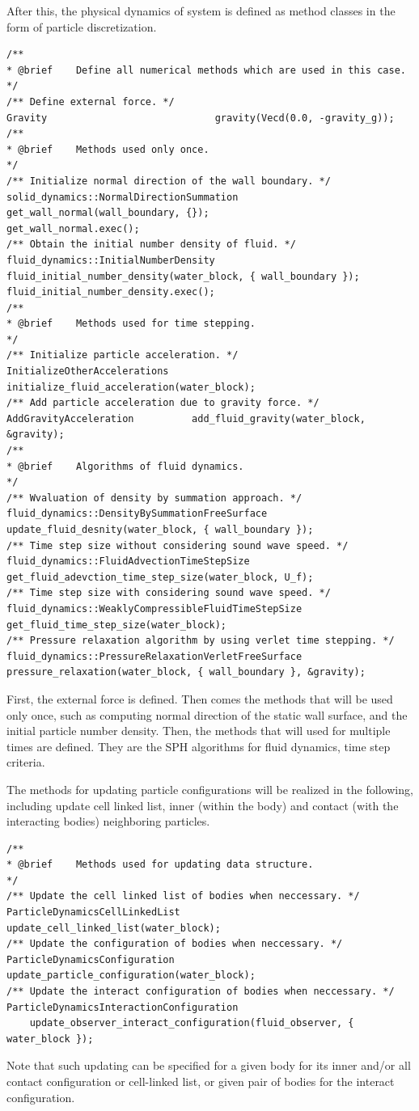 \documentclass[12pt, a4paper,onecolumn]{article}
\begin{document}
After this, the physical dynamics of system is defined 
as method classes in the form of particle discretization.
%
\begin{lstlisting}[basicstyle=\ttfamily\footnotesize]
	/**
* @brief 	Define all numerical methods which are used in this case.
*/
/** Define external force. */
Gravity 							gravity(Vecd(0.0, -gravity_g));
/**
* @brief 	Methods used only once.
*/
/** Initialize normal direction of the wall boundary. */
solid_dynamics::NormalDirectionSummation 	get_wall_normal(wall_boundary, {});
get_wall_normal.exec();
/** Obtain the initial number density of fluid. */
fluid_dynamics::InitialNumberDensity 		
fluid_initial_number_density(water_block, { wall_boundary });
fluid_initial_number_density.exec();
/**
* @brief 	Methods used for time stepping.
*/
/** Initialize particle acceleration. */
InitializeOtherAccelerations 	initialize_fluid_acceleration(water_block);
/** Add particle acceleration due to gravity force. */
AddGravityAcceleration 			add_fluid_gravity(water_block, &gravity);
/**
* @brief 	Algorithms of fluid dynamics.
*/
/** Wvaluation of density by summation approach. */
fluid_dynamics::DensityBySummationFreeSurface 		
update_fluid_desnity(water_block, { wall_boundary });
/** Time step size without considering sound wave speed. */
fluid_dynamics::FluidAdvectionTimeStepSize 			
get_fluid_adevction_time_step_size(water_block, U_f);
/** Time step size with considering sound wave speed. */
fluid_dynamics::WeaklyCompressibleFluidTimeStepSize get_fluid_time_step_size(water_block);
/** Pressure relaxation algorithm by using verlet time stepping. */
fluid_dynamics::PressureRelaxationVerletFreeSurface 
pressure_relaxation(water_block, { wall_boundary }, &gravity);
\end{lstlisting}
%
First, the external force is defined.
Then comes the methods that will be used only once,
such as computing normal direction of the static wall surface, 
and  the initial particle number density. 
Then, the methods that will used for multiple times are defined.
They are the SPH algorithms for fluid dynamics, time step criteria.

The methods for updating particle configurations will be realized in the following,
including update cell linked list, inner (within the body) 
and contact (with the interacting bodies) neighboring particles.
%
\begin{lstlisting}[basicstyle=\ttfamily\footnotesize]
/**
* @brief 	Methods used for updating data structure.
*/
/** Update the cell linked list of bodies when neccessary. */
ParticleDynamicsCellLinkedList			update_cell_linked_list(water_block);
/** Update the configuration of bodies when neccessary. */
ParticleDynamicsConfiguration 			update_particle_configuration(water_block);
/** Update the interact configuration of bodies when neccessary. */
ParticleDynamicsInteractionConfiguration 	
	update_observer_interact_configuration(fluid_observer, { water_block });
\end{lstlisting}
%
Note that such updating can be specified for a given body for its inner and/or 
all contact configuration or cell-linked list, 
or given pair of bodies for the interact configuration.
\end{document}
